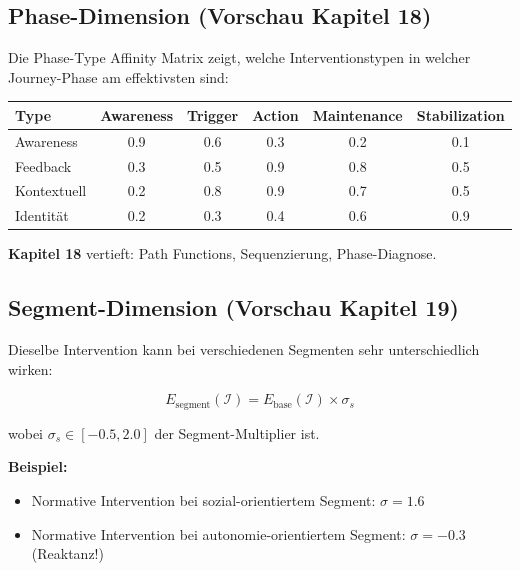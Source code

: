 \subsection{Phase-Dimension (Vorschau Kapitel 18)}

Die Phase-Type Affinity Matrix zeigt, welche Interventionstypen in welcher Journey-Phase am effektivsten sind:

\begin{center}
\small
\renewcommand{\arraystretch}{1.2}
\begin{tabular}{@{}lccccc@{}}
\toprule
\textbf{Type} & \textbf{Awareness} & \textbf{Trigger} & \textbf{Action} & \textbf{Maintenance} & \textbf{Stabilization} \\
\midrule
Awareness & \cellcolor{green!30}0.9 & 0.6 & 0.3 & 0.2 & 0.1 \\
Feedback & 0.3 & 0.5 & \cellcolor{green!30}0.9 & \cellcolor{green!30}0.8 & 0.5 \\
Kontextuell & 0.2 & \cellcolor{green!30}0.8 & \cellcolor{green!30}0.9 & 0.7 & 0.5 \\
Identität & 0.2 & 0.3 & 0.4 & 0.6 & \cellcolor{green!30}0.9 \\
\bottomrule
\end{tabular}
\end{center}

\textbf{Kapitel 18} vertieft: Path Functions, Sequenzierung, Phase-Diagnose.


\subsection{Segment-Dimension (Vorschau Kapitel 19)}

Dieselbe Intervention kann bei verschiedenen Segmenten sehr unterschiedlich wirken:

\begin{equation}
E_{\text{segment}}(\mathcal{I}) = E_{\text{base}}(\mathcal{I}) \times \sigma_s
\end{equation}

wobei $\sigma_s \in [-0.5, 2.0]$ der Segment-Multiplier ist.

\textbf{Beispiel:}
\begin{itemize}[nosep]
\item Normative Intervention bei sozial-orientiertem Segment: $\sigma = 1.6$
\item Normative Intervention bei autonomie-orientiertem Segment: $\sigma = -0.3$ (Reaktanz!)
\end{itemize}

